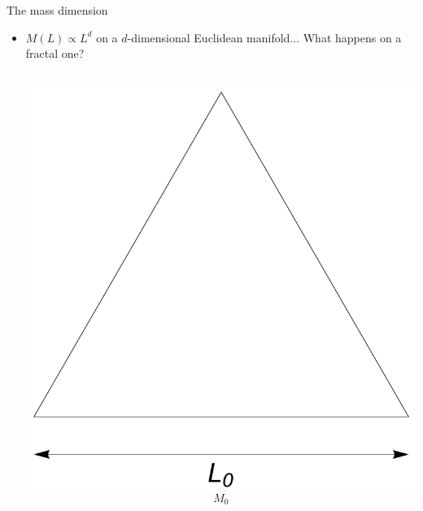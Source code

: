 \documentclass[xcolor=x11names,compress,professionalfonts]{beamer}
\renewcommand{\(}{\begin{columns}}
\renewcommand{\)}{\end{columns}}
\newcommand{\<}[1]{\begin{column}{#1}}
\renewcommand{\>}{\end{column}}
\begin{document}
\begin{frame}{The mass dimension}

\begin{itemize}
	\item $M(L) \propto L^d$ on a $d$-dimensional Euclidean manifold... What happens on a fractal one?

\begin{columns}
\newcommand{\s}{.2}
  \begin{column}{3cm}
  	\centering
    \includegraphics[scale=\s]{scale0.pdf}
    \scriptsize
    \[ M_0 \]
  \end{column}


\end{columns}
\end{itemize}
\end{frame}
\end{document}
